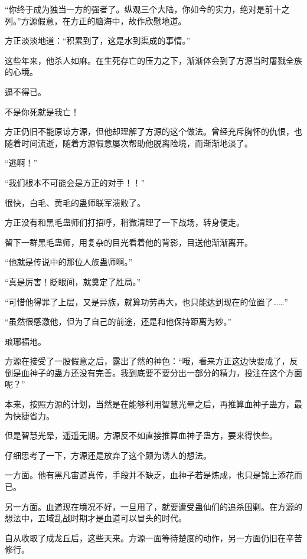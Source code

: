 
\begin{this_body}

“你终于成为独当一方的强者了。纵观三个大陆，你如今的实力，绝对是前十之列。”方源假意，在方正的脑海中，故作欣慰地道。

方正淡淡地道：“积累到了，这是水到渠成的事情。”

这些年来，他杀人如麻。在生死存亡的压力之下，渐渐体会到了方源当时屠戮全族的心境。

逼不得已。

不是你死就是我亡！

方正仍旧不能原谅方源，但他却理解了方源的这个做法。曾经充斥胸怀的仇恨，也随着时间流逝，随着方源假意屡次帮助他脱离险境，而渐渐地淡了。

“逃啊！”

“我们根本不可能会是方正的对手！！”

很快，白毛、黄毛的蛊师联军溃败了。

方正没有和黑毛蛊师们打招呼，稍微清理了一下战场，转身便走。

留下一群黑毛蛊师，用复杂的目光看着他的背影，目送他渐渐离开。

“他就是传说中的那位人族蛊师啊。”

“真是厉害！眨眼间，就奠定了胜局。”

“可惜他得罪了上层，又是异族，就算功劳再大，也只能达到现在的位置了……”

“虽然很感激他，但为了自己的前途，还是和他保持距离为妙。”

琅琊福地。

方源在接受了一股假意之后，露出了然的神色：“哦，看来方正这边快要成了，反倒是血神子的蛊方还没有完善。我到底要不要分出一部分的精力，投注在这个方面呢？”

本来，按照方源的计划，当然是在能够利用智慧光晕之后，再推算血神子蛊方，最为快捷省力。

但是智慧光晕，遥遥无期。方源反不如直接推算血神子蛊方，要来得快些。

仔细思考了一下，方源还是放弃了这个颇为诱人的想法。

一方面。他有黑凡宙道真传，手段并不缺乏，血神子若是炼成，也只是锦上添花而已。

另一方面。血道现在境况不好，一旦用了，就要遭受蛊仙们的追杀围剿。在方源的想法中，五域乱战时期才是血道可以冒头的时代。

自从收取了成龙丘后，这些天来。方源一面等待楚度的动作，另一方面仍旧在辛苦修行。


\end{this_body}
